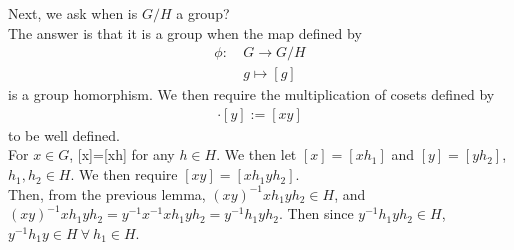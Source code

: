 \documentclass{article}
\theoremstyle{definition}
\theoremstyle{remark}
\begin{document}
Next, we ask when is $G/H$ a group?\\
The answer is that it is a group when the map defined by
\begin{align*}
	\phi:~ & G\rightarrow G/H \\
	       & g\mapsto [g]
\end{align*}
is a group homorphism. 
We then require the multiplication of cosets defined by
\begin{align*}
	[x]\cdot[y]:=[xy]
\end{align*}
to be well defined.\\
\indent For $x\in G$, [x]=[xh] for any $h\in H$. We then let $[x]=[xh_1]$ and $[y]=[yh_2]$, $h_1,h_2\in H$. We then require $[xy]=[xh_1yh_2]$.\\
\indent Then, from the previous lemma, $(xy)^{-1}xh_1yh_2\in H$, and $(xy)^{-1}xh_1yh_2=y^{-1}x^{-1}xh_1yh_2=y^{-1}h_1yh_2$. Then since $y^{-1}h_1yh_2\in H$, $y^{-1}h_1y\in H~\forall ~h_1\in H$.\\
\end{document}
